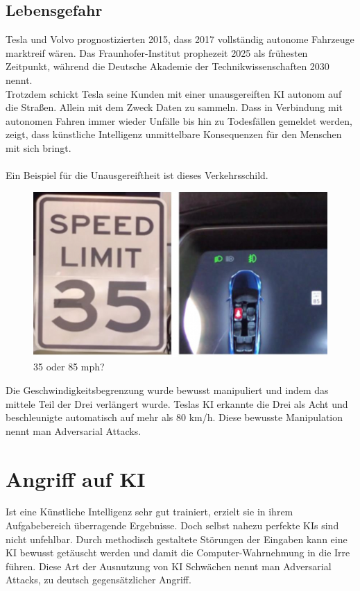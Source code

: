 \documentclass[12pt,oneside,a4paper,parskip]{scrbook}
\begin{document}
\subsection{Lebensgefahr}
Tesla und Volvo prognostizierten 2015, dass 2017 vollständig autonome Fahrzeuge marktreif wären. Das Fraunhofer-Institut prophezeit 2025 als frühesten Zeitpunkt, während die Deutsche Akademie der Technikwissenschaften 2030 nennt. %
\\Trotzdem schickt Tesla seine Kunden mit einer unausgereiften KI autonom auf die Straßen. Allein mit dem Zweck Daten zu sammeln. Dass in Verbindung mit autonomen Fahren immer wieder Unfälle bis hin zu Todesfällen gemeldet werden, zeigt, dass künstliche Intelligenz unmittelbare Konsequenzen für den Menschen mit sich bringt. \\\\
Ein Beispiel für die Unausgereiftheit ist dieses Verkehrsschild. %
\begin{figure}[h]
	\begin{center}
		\includegraphics[width=15cm]{Bilder/Tesla_Adversarial_Attack.png}
		\caption{35 oder 85 mph?}
		\label{fig:Verkehrsschild}
	\end{center}
\end{figure}
Die Geschwindigkeitsbegrenzung wurde bewusst manipuliert und indem das mittele Teil der Drei verlängert wurde. Teslas KI erkannte die Drei als Acht und beschleunigte automatisch auf mehr als 80 km/h. Diese bewusste Manipulation nennt man Adversarial Attacks.
\section{Angriff auf KI}
Ist eine Künstliche Intelligenz sehr gut trainiert, erzielt sie in ihrem Aufgabebereich überragende Ergebnisse. Doch selbst nahezu perfekte KIs sind nicht unfehlbar. Durch methodisch gestaltete Störungen der Eingaben kann eine KI bewusst getäuscht werden und damit die Computer-Wahrnehmung in die Irre führen. Diese Art der Ausnutzung von KI Schwächen nennt man Adversarial Attacks, zu deutsch gegensätzlicher Angriff.
\end{document}
